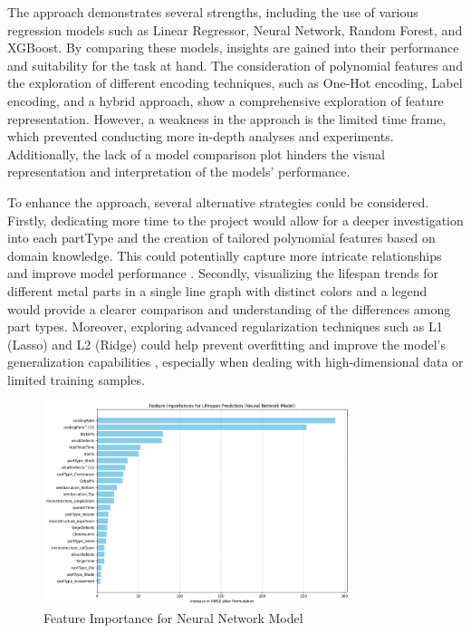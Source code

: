 \documentclass{article}
\begin{document}
The approach demonstrates several strengths, including the use of various regression models such as Linear Regressor, Neural Network, Random Forest, and XGBoost. By comparing these models, insights are gained into their performance and suitability for the task at hand. The consideration of polynomial features and the exploration of different encoding techniques, such as One-Hot encoding, Label encoding, and a hybrid approach, show a comprehensive exploration of feature representation. However, a weakness in the approach is the limited time frame, which prevented conducting more in-depth analyses and experiments. Additionally, the lack of a model comparison plot hinders the visual representation and interpretation of the models' performance.

To enhance the approach, several alternative strategies could be considered. Firstly, dedicating more time to the project would allow for a deeper investigation into each partType and the creation of tailored polynomial features based on domain knowledge. This could potentially capture more intricate relationships and improve model performance \parencite{paulson2022feature}. Secondly, visualizing the lifespan trends for different metal parts in a single line graph with distinct colors and a legend would provide a clearer comparison and understanding of the differences among part types. Moreover, exploring advanced regularization techniques such as L1 (Lasso) and L2 (Ridge) could help prevent overfitting and improve the model's generalization capabilities \parencite{jagtap2022activation}, especially when dealing with high-dimensional data or limited training samples.

\newpage
\begin{figure}[htbp]
    \centering
    \includegraphics[width=0.8\textwidth]{./Images/FeatureImportance-NeuralNetwork.png}
    \caption{Feature Importance for Neural Network Model}
    \label{fig:feature_importance_neural_network}
\end{figure}
\end{document}
